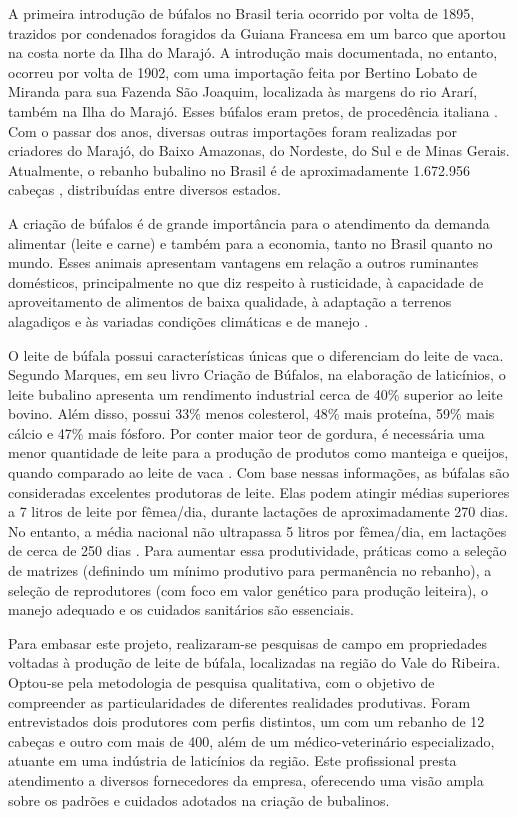 A primeira introdução de búfalos no Brasil teria ocorrido por volta de 1895, trazidos por condenados foragidos da Guiana Francesa em um barco que aportou na costa norte da Ilha do Marajó. A introdução mais documentada, no entanto, ocorreu por volta de 1902, com uma importação feita por Bertino Lobato de Miranda para sua Fazenda São Joaquim, localizada às margens do rio Ararí, também na Ilha do Marajó. Esses búfalos eram pretos, de procedência italiana \cite{ABCB2016}. Com o passar dos anos, diversas outras importações foram realizadas por criadores do Marajó, do Baixo Amazonas, do Nordeste, do Sul e de Minas Gerais. Atualmente, o rebanho bubalino no Brasil é de aproximadamente 1.672.956 cabeças \cite{IBGE2023}, distribuídas entre diversos estados.

A criação de búfalos é de grande importância para o atendimento da demanda alimentar (leite e carne) e também para a economia, tanto no Brasil quanto no mundo. Esses animais apresentam vantagens em relação a outros ruminantes domésticos, principalmente no que diz respeito à rusticidade, à capacidade de aproveitamento de alimentos de baixa qualidade, à adaptação a terrenos alagadiços e às variadas condições climáticas e de manejo \cite{EMBRAPA2019}.

O leite de búfala possui características únicas que o diferenciam do leite de vaca. Segundo Marques, em seu livro Criação de Búfalos, na elaboração de laticínios, o leite bubalino apresenta um rendimento industrial cerca de 40\% superior ao leite bovino. Além disso, possui 33\% menos colesterol, 48\% mais proteína, 59\% mais cálcio e 47\% mais fósforo. Por conter maior teor de gordura, é necessária uma menor quantidade de leite para a produção de produtos como manteiga e queijos, quando comparado ao leite de vaca \cite{Embrapa1998}. Com base nessas informações, as búfalas são consideradas excelentes produtoras de leite. Elas podem atingir médias superiores a 7 litros de leite por fêmea/dia, durante lactações de aproximadamente 270 dias. No entanto, a média nacional não ultrapassa 5 litros por fêmea/dia, em lactações de cerca de 250 dias \cite{Embrapa1998}. Para aumentar essa produtividade, práticas como a seleção de matrizes (definindo um mínimo produtivo para permanência no rebanho), a seleção de reprodutores (com foco em valor genético para produção leiteira), o manejo adequado e os cuidados sanitários são essenciais.

Para embasar este projeto, realizaram-se pesquisas de campo em propriedades voltadas à produção de leite de búfala, localizadas na região do Vale do Ribeira. Optou-se pela metodologia de pesquisa qualitativa, com o objetivo de compreender as particularidades de diferentes realidades produtivas. Foram entrevistados dois produtores com perfis distintos, um com um rebanho de 12 cabeças e outro com mais de 400, além de um médico-veterinário especializado, atuante em uma indústria de laticínios da região. Este profissional presta atendimento a diversos fornecedores da empresa, oferecendo uma visão ampla sobre os padrões e cuidados adotados na criação de bubalinos.

